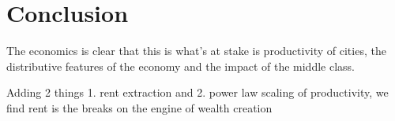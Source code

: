 

\chapter{Conclusion}


The economics is clear that this is what's at stake is productivity of cities, the distributive features of the economy and the impact of the middle class.


Adding 2 things 1. rent extraction and 2. power law scaling of productivity, we find rent is the breaks on the engine of wealth creation